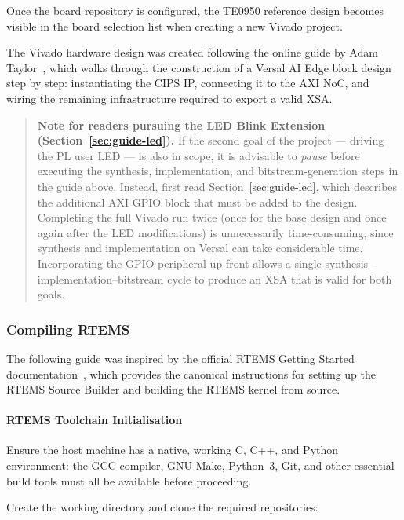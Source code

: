 \documentclass[
	a4paper,
]{CSMakotoTechnicalReport}
\begin{document}
Once the board repository is configured, the TE0950 reference design becomes visible in the board selection list when creating a new Vivado project.

The Vivado hardware design was created following the online guide by Adam Taylor~\cite{adiuvo-versal-design}, which walks through the construction of a Versal AI Edge block design step by step: instantiating the CIPS IP, connecting it to the AXI NoC, and wiring the remaining infrastructure required to export a valid XSA.

\begin{quote}
\textbf{Note for readers pursuing the LED Blink Extension (Section~\ref{sec:guide-led}).}
If the second goal of the project --- driving the PL user LED --- is also in scope, it is advisable to \emph{pause} before executing the synthesis, implementation, and bitstream-generation steps in the guide above.
Instead, first read Section~\ref{sec:guide-led}, which describes the additional AXI GPIO block that must be added to the design.
Completing the full Vivado run twice (once for the base design and once again after the LED modifications) is unnecessarily time-consuming, since synthesis and implementation on Versal can take considerable time.
Incorporating the GPIO peripheral up front allows a single synthesis--implementation--bitstream cycle to produce an XSA that is valid for both goals.
\end{quote}

\subsubsection{Compiling RTEMS}
\label{sec:guide-rtems-build}

The following guide was inspired by the official RTEMS Getting Started documentation~\cite{rtems-user-start}, which provides the canonical instructions for setting up the RTEMS Source Builder and building the RTEMS kernel from source.

\paragraph*{RTEMS Toolchain Initialisation}

Ensure the host machine has a native, working C, C++, and Python environment: the GCC compiler, GNU Make, Python~3, Git, and other essential build tools must all be available before proceeding.

Create the working directory and clone the required repositories:
\end{document}
